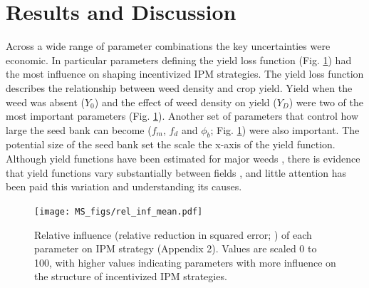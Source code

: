\documentclass[12pt, a4paper]{article}
\begin{document}
\section*{Results and Discussion}
Across a wide range of parameter combinations the key uncertainties were economic. In particular parameters defining the yield loss function (Fig. \ref{fig:rel_inf}) had the most influence on shaping incentivized IPM strategies. The yield loss function describes the relationship between weed density and crop yield. Yield when the weed was absent ($Y_0$) and the effect of weed density on yield ($Y_D$) were two of the most important parameters (Fig. \ref{fig:rel_inf}). Another set of parameters that control how large the seed bank can become ($f_m$, $f_d$ and $\phi_b$; Fig. \ref{fig:rel_inf}) were also important. The potential size of the seed bank set the scale the x-axis of the yield function. Although yield functions have been estimated for major weeds \citep{Cous1985, Doyl1986, Swin1994}, there is evidence that yield functions vary substantially between fields \citep{Swin1994, Hick2018}, and little attention has been paid this variation and understanding its causes.
 \begin{figure}
	\centering
	\texttt{[image: MS\_figs/rel\_inf\_mean.pdf]}
	\caption{Relative influence (relative reduction in squared error; \citealp{Mill2016}) of each parameter on IPM strategy (Appendix 2). Values are scaled 0 to 100, with higher values indicating parameters with more influence on the structure of incentivized IPM strategies.}
	\label{fig:rel_inf} 
\end{figure}
\end{document}
